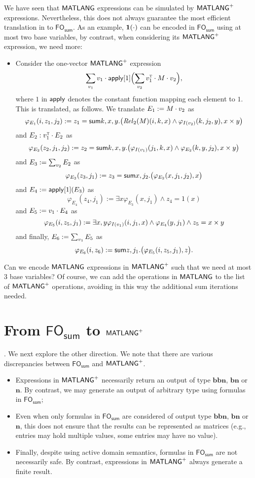 We have seen that $\mathsf{MATLANG}$ expressions can be simulated by $\mathsf{MATLANG}^{\sf +}$ expressions. Nevertheless,
this does not always guarantee the most efficient translation in to $\textsf{FO}_{\textsf{sum}}$.
As an example, $\mathbf{1}(\cdot)$ can be encoded in $\textsf{FO}_{\textsf{sum}}$ using at most
two base variables, by contrast, when considering its $\mathsf{MATLANG}^{\sf +}$ expression, we need more:

\begin{itemize}
\item Consider the one-vector $\mathsf{MATLANG}^{\sf +}$ expression 
$$
\sum_{v_1} v_1\cdot  \mathsf{apply}[1]\Bigl(\sum_{v_2} v_1^{\textsc{t}}\cdot M\cdot v_2\Bigr),
$$
where $1$ in $\mathsf{apply}$ denotes the constant function mapping each element to $1$. 
This is translated, as follows. We translate $E_1:=M\cdot v_2$ as
$$
\varphi_{E_1}(i,z_1,j_2):=z_1=\mathsf{sum} k,x,y.\bigl(\mathit{Rel}_2(M)(i,k,x)\land \varphi_{I(v_2)}(k,j_2,y),x\times y\bigr)
$$
and $E_2:v_1^{\textsc{t}}\cdot E_2$ as 
$$
\varphi_{E_2}(z_2,j_1,j_2):=z_2=\mathsf{sum} k,x,y.\bigl(\varphi_{I(v_1)}(j_1,k,x)\land \varphi_{E_2}(k,y,j_2),x\times y\bigr)
$$
and $E_3:=\sum_{v_2} E_2$ as
$$
\varphi_{E_3}(z_3,j_1):=z_3=\mathsf{sum} x,j_2. \bigl( \varphi_{E_2}(x,j_1,j_2),x\bigr)
$$
and $E_4:=\mathsf{apply}[1](E_3)$ as
$$
\varphi_{E_4}(z_4,j_1):=\exists x \varphi_{E_3}(x,j_1)\land z_4=1(x)
$$
and $E_5:=v_1\cdot E_4$ as
$$
\varphi_{E_5}(i,z_5,j_1):=\exists x,y \varphi_{I(v_1)}(i,j_1,x)\land \varphi_{E_4}(y,j_1)\land z_5=x\times y
$$
and finally, $E_6:=\sum_{v_1} E_5$ as 
$$
\varphi_{E_6}(i,z_6):=\mathsf{sum} z, j_1. \bigl(\varphi_{E_5}(i,z_5,j_1),z\bigr).
$$
\end{itemize}

\begin{todo}
Can we encode $\mathsf{MATLANG}$ expressions in $\mathsf{MATLANG}^{\sf +}$ such that we need at most 3 base variables? Of course, we can add the operations in $\mathsf{MATLANG}$ to the list of $\mathsf{MATLANG}^{\sf +}$ operations, avoiding in this way the additional sum iterations needed.
\end{todo}

\section{From $\textsf{FO}_{\textsf{sum}}$ to $\mathsf{MATLANG}^{\sf +}$}.
We next explore the other direction. We note that there are various discrepancies between $\textsf{FO}_{\textsf{sum}}$ and $\mathsf{MATLANG}^{\sf +}$. 
\begin{itemize}
\item Expressions in $\mathsf{MATLANG}^{\sf +}$ necessarily return an output of type $\mathbf{b}\mathbf{b}\mathbf{n}$, $\mathbf{b}\mathbf{n}$ or $\mathbf{n}$. By contrast,
we may generate an output of arbitrary type using formulas in   $\textsf{FO}_{\textsf{sum}}$;
\item Even when only  formulas in   $\textsf{FO}_{\textsf{sum}}$ are considered of output type $\mathbf{b}\mathbf{b}\mathbf{n}$, $\mathbf{b}\mathbf{n}$ or $\mathbf{n}$,
this does not ensure that the results can be represented as matrices (e.g., entries may hold multiple values, some entries may have no value).
\item Finally, despite using active domain semantics, formulas in $\textsf{FO}_{\textsf{sum}}$ are not necessarily safe. By contrast, expressions in $\mathsf{MATLANG}^{\sf +}$ always
generate a finite result.
\end{itemize}

